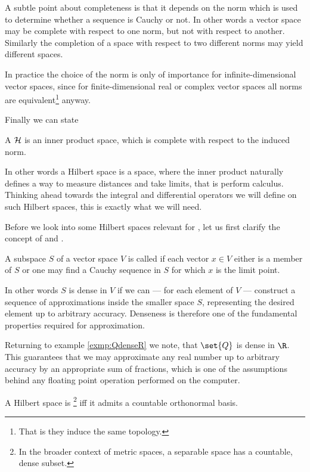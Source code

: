 \begin{rem}
	A subtle point about completeness is that it depends
	on the norm which is used to determine whether a sequence
	is Cauchy or not.
	In other words a vector space may be complete with respect to one norm,
	but not with respect to another.
	Similarly the completion of a space with respect to two different
	norms may yield different spaces.

	In practice the choice of the norm is only of importance for
	infinite-dimensional vector spaces,
	since for finite-dimensional real or complex vector spaces
	all norms are equivalent\footnote{That is they induce the same topology.}
	anyway.
\end{rem}

\noindent
Finally we can state
\begin{defn}
	A  $\mathcal{H}$ is an inner product space,
	which is complete with respect to the induced norm.
\end{defn}
In other words a Hilbert space is a space,
where the inner product naturally defines a way to measure distances
and take limits, that is perform calculus.
Thinking ahead towards the integral and differential operators
we will define on such Hilbert spaces,
this is exactly what we will need.

Before we look into some Hilbert spaces relevant for \QM,
let us first clarify the concept of  and .
\begin{defn}
	A subspace $S$ of a vector space $V$ is called 
	if each vector $x \in V$ either is a member of $S$ or one may find
	a Cauchy sequence in $S$ for which $x$ is the limit point.
\end{defn}
In other words $S$ is dense in $V$ if we can --- for each element of $V$
--- construct a sequence of approximations inside the smaller space $S$,
representing the desired element up to arbitrary accuracy.
Denseness is therefore one of the fundamental properties required for approximation.

\begin{exmp}
	Returning to example \vref{exmp:QdenseR} we note,
	that $\set{Q}$ is dense in $\R$.
	This guarantees that we may approximate any real number
	up to arbitrary accuracy by an appropriate sum of fractions,
	which is one of the assumptions behind any floating point operation
	performed on the computer.
\end{exmp}

\begin{defn}
	A Hilbert space is %
	\footnote{In the broader context of metric spaces,
	a separable space has a countable, dense subset.}
	iff it admits a countable orthonormal basis.
\end{defn}

